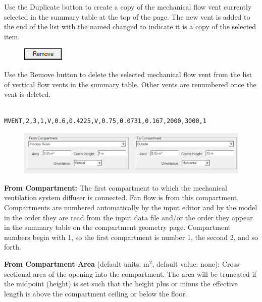 Use the Duplicate button to create a copy of the mechanical flow vent currently selected in the summary table at the top of the page. The new vent is added to the end of the list with the named changed to indicate it is a copy of the selected item. \\

\begin{figure}
  \includegraphics[width=0.781in]{FIGURES/Input_File/Remove_Button}
\end{figure}

Use the Remove button to delete the selected mechanical flow vent from the list of vertical flow vents in the summary table.  Other vents are renumbered once the vent is deleted. \\~ \\

\begin{lstlisting}
MVENT,2,3,1,V,0.6,0.4225,V,0.75,0.0731,0.167,2000,3000,1
\end{lstlisting}

\begin{figure}[h!]
\begin{center}
\includegraphics[width=4.553in]{FIGURES/Input_File/Mechanical_Vent_From_To}
\end{center}
\end{figure}

\textbf{From Compartment:} The first compartment to which the mechanical ventilation system diffuser is connected. Fan flow is from this compartment.  Compartments are numbered automatically by the input editor and by the model in the order they are read from the input data file and/or the order they appear in the summary table on the compartment geometry page. Compartment numbers begin with 1, so the first compartment is number 1, the second 2, and so forth.

\textbf{From Compartment Area} (default units: m$^2$, default value: none): Cross-sectional area of the opening into the compartment. The area will be truncated if the midpoint (height) is set such that the height plus or minus the effective length is above the compartment ceiling or below the floor.

